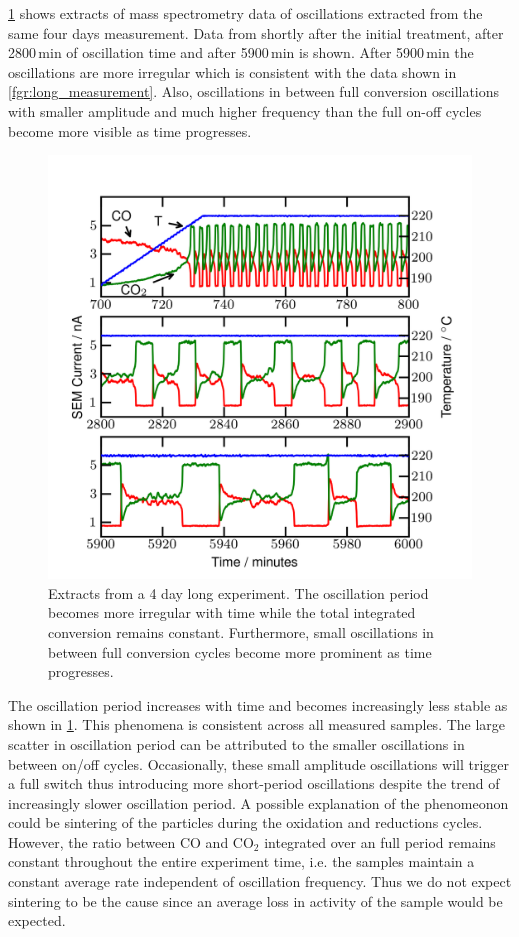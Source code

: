 \documentclass[journal=jacsat,manuscript=article]{achemso}
\begin{document}
\ref{fgr:extracts} shows extracts of mass spectrometry data of oscillations
extracted from the same four days measurement. Data from shortly after the
initial treatment, after 2800\,min of oscillation time and after 5900\,min is
shown. After 5900\,min the oscillations are more irregular which is consistent
with the data shown in \ref{fgr:long_measurement}. Also, oscillations in
between full conversion oscillations with smaller amplitude and much higher
frequency than the full on-off cycles become more visible as time progresses.
\begin{figure}
  \includegraphics[width=12cm]{extracts_from_very_long_oscillation.png}
  \caption{Extracts from a 4 day long experiment. The oscillation period
  becomes more irregular with time while the total integrated conversion
  remains constant. Furthermore, small oscillations in between full conversion
  cycles become more prominent as time progresses.} \label{fgr:extracts}
\end{figure}

The oscillation period increases with time and becomes increasingly less stable
as shown in \ref{fgr:extracts}. This phenomena is  consistent across all
measured samples. The large scatter in oscillation period can be attributed to
the smaller oscillations in between on/off cycles. Occasionally, these small
amplitude oscillations will trigger a full switch thus introducing more
short-period oscillations despite the trend of increasingly slower oscillation
period. A possible explanation of the phenomeonon could be sintering of the
particles during the oxidation and reductions cycles. However, the ratio
between CO and CO$_2$ integrated over an full period remains constant
throughout the entire experiment time, i.e. the samples maintain a constant
average rate independent of oscillation frequency. Thus we do not expect
sintering to be the cause since an average loss in activity of the sample would
be expected.
\end{document}
